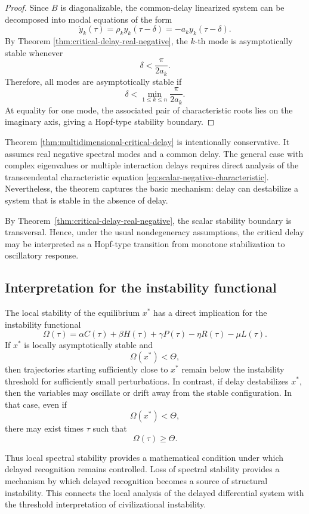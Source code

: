 \documentclass[11pt]{article}
\begin{document}
\begin{proof}
	Since $B$ is diagonalizable, the common-delay linearized system can be decomposed into modal equations of the form
	\[
	\dot y_k(\tau)=\rho_k y_k(\tau-\delta)
	=
	-a_k y_k(\tau-\delta).
	\]
	By Theorem \ref{thm:critical-delay-real-negative}, the $k$-th mode is asymptotically stable whenever
	\[
	\delta<\frac{\pi}{2a_k}.
	\]
	Therefore, all modes are asymptotically stable if
	\[
	\delta<\min_{1\leq k\leq n}\frac{\pi}{2a_k}.
	\]
	At equality for one mode, the associated pair of characteristic roots lies on the imaginary axis, giving a Hopf-type stability boundary.
\end{proof}


	Theorem \ref{thm:multidimensional-critical-delay} is intentionally conservative. It assumes real negative spectral modes and a common delay. The general case with complex eigenvalues or multiple interaction delays requires direct analysis of the transcendental characteristic equation \eqref{eq:scalar-negative-characteristic}. Nevertheless, the theorem captures the basic mechanism: delay can destabilize a system that is stable in the absence of delay.



By Theorem~\ref{thm:critical-delay-real-negative}, the scalar stability boundary is transversal. Hence, under the usual nondegeneracy assumptions, the critical delay may be interpreted as a Hopf-type transition from monotone stabilization to oscillatory response.


 \subsection{Interpretation for the instability functional}
 
 The local stability of the equilibrium $x^\ast$ has a direct implication for
 the instability functional
 \[
 \Omega(\tau)
 =
 \alpha C(\tau)
 +
 \beta H(\tau)
 +
 \gamma P(\tau)
 -
 \eta R(\tau)
 -
 \mu L(\tau).
 \]
 If $x^\ast$ is locally asymptotically stable and
 \[
 \Omega(x^\ast)<\Theta,
 \]
 then trajectories starting sufficiently close to $x^\ast$ remain below the
 instability threshold for sufficiently small perturbations. In contrast, if
 delay destabilizes $x^\ast$, then the variables may oscillate or drift away
 from the stable configuration. In that case, even if
 \[
 \Omega(x^\ast)<\Theta,
 \]
 there may exist times $\tau$ such that
 \[
 \Omega(\tau)\geq \Theta.
 \]
 
 Thus local spectral stability provides a mathematical condition under which
 delayed recognition remains controlled. Loss of spectral stability provides a
 mechanism by which delayed recognition becomes a source of structural
 instability. This connects the local analysis of the delayed differential
 system with the threshold interpretation of civilizational instability.
 
\end{document}
